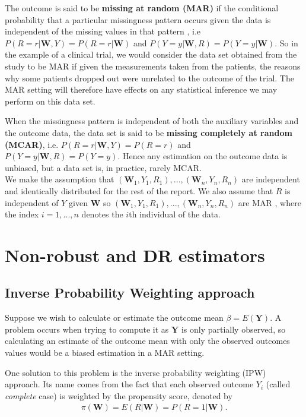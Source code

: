 \documentclass[12pt,twoside]{article}
\begin{document}
The outcome is said to be \textbf{missing at random (MAR)} if the conditional probability that a particular missingness pattern occurs given the data is independent of the missing values in that pattern \citep{vansteelandt}, i.e $P(R=r|\mathbf{W}, Y) = P(R= r|\mathbf{W})$ and  $P(Y=y|\mathbf{W}, R) = P(Y=y|\mathbf{W})$. So in the example of a clinical trial, we would consider the data set obtained from the study to be MAR if given the measurements taken from the patients, the reasons why some patients dropped out were unrelated to the outcome of the trial. The MAR setting will therefore have effects on any statistical inference we may perform on this data set.

When the missingness pattern is independent of both the auxiliary variables and the outcome data, the data set is said to be \textbf{missing completely at random (MCAR)}, i.e. $P(R=r|\mathbf{W}, Y) = P(R = r)$ and  $P(Y=y|\mathbf{W}, R) = P(Y=y)$. Hence any estimation on the outcome data is unbiased, but a data set is, in practice, rarely MCAR.\\

We make the assumption that $(\mathbf{W}_1, Y_1, R_1),...,(\mathbf{W}_n, Y_n, R_n)$ are independent and identically distributed for the rest of the report. We also assume that $R$ is independent of $Y$ given $\mathbf{W}$ so $(\mathbf{W}_1, Y_1, R_1), ... ,(\mathbf{W}_n, Y_n, R_n)$ are MAR \citep{vansteelandt}, where the index $i = 1,...,n$ denotes the $i$th individual of the data.\\

\section{Non-robust and DR estimators}

\subsection{Inverse Probability Weighting approach}

Suppose we wish to calculate or estimate the outcome mean $\beta = E(\mathbf{Y})$. A problem occurs when trying to compute it as $\mathbf{Y}$ is only partially observed, so calculating an estimate of the outcome mean with only the observed outcomes values would be a biased estimation in a MAR setting.

One solution to this problem is the inverse probability weighting (IPW) approach. Its name comes from the fact that each observed outcome $Y_i$ (called \textit{complete} case) is weighted by the propensity score, denoted by
\begin{align*}
    \pi(\mathbf{W})= E(R|\mathbf{W}) = P(R = 1|\mathbf{W}).
\end{align*}
\end{document}
